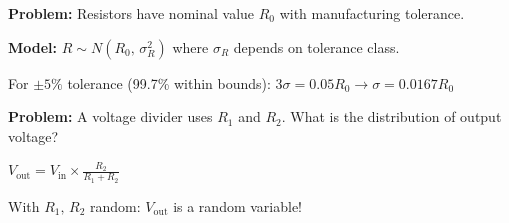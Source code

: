 

\textbf{Problem:} Resistors have nominal value $R_{0}$ with manufacturing tolerance.

\textbf{Model:} $R \sim N(R_{0},\, \sigma_{R}^{2})$ where $\sigma_{R}$ depends on tolerance class.

For $\pm 5\%$ tolerance (99.7\% within bounds): $3\sigma = 0.05R_{0} \to \sigma = 0.0167R_{0}$


\textbf{Problem:} A voltage divider uses $R_{1}$ and $R_{2}$. What is the distribution of output voltage?

$\displaystyle V_{\mathrm{out}} = V_{\mathrm{in}} \times \frac{R_{2}}{R_{1} + R_{2}}$

With $R_{1},\, R_{2}$ random: $V_{\mathrm{out}}$ is a random variable!


